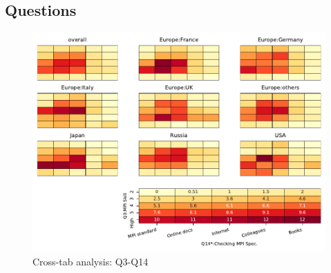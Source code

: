 
\subsection{Questions}


\begin{figure}
\begin{center}
\includegraphics[width=12cm]{../pdfs/Q3-Q14.pdf}
\caption{Cross-tab analysis: Q3-Q14}
\label{fig:Q3-Q14}
\end{center}
\end{figure}
